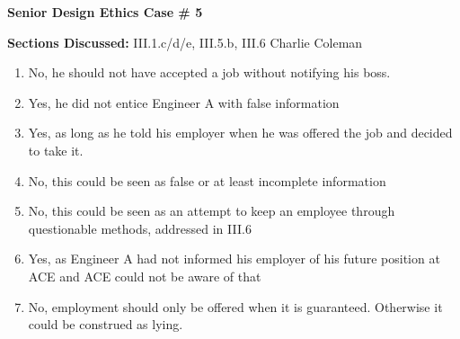 \documentclass{article}
\begin{document}
	\begin{center}\begin{large} \textbf{Senior Design Ethics Case \# 5} \end{large}\end{center}
	
	
	\noindent \textbf{Sections Discussed:} III.1.c/d/e, III.5.b, III.6 \hfill Charlie Coleman
	
	\begin{enumerate}
		\item No, he should not have accepted a job without notifying his boss.
		\item Yes, he did not entice Engineer A with false information
		\item Yes, as long as he told his employer when he was offered the job and decided to take it.
		\item No, this could be seen as false or at least incomplete information
		\item No, this could be seen as an attempt to keep an employee through questionable methods, addressed in III.6
		\item Yes, as Engineer A had not informed his employer of his future position at ACE and ACE could not be aware of that
		\item No, employment should only be offered when it is guaranteed. Otherwise it could be construed as lying.
	\end{enumerate}
\end{document}
